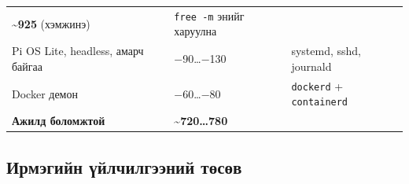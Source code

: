 \begin{longtable}[]{@{}lll@{}}
\begin{minipage}[t]{0.30\columnwidth}
\textbf{\textasciitilde925} (хэмжинэ)\strut
\end{minipage} & \begin{minipage}[t]{0.30\columnwidth}\raggedright
\texttt{free\ -m} энийг харуулна\strut
\end{minipage}\tabularnewline
\begin{minipage}[t]{0.30\columnwidth}\raggedright
Pi OS Lite, headless, амарч байгаа\strut
\end{minipage} & \begin{minipage}[t]{0.30\columnwidth}\raggedright
−90\ldots−130\strut
\end{minipage} & \begin{minipage}[t]{0.30\columnwidth}\raggedright
systemd, sshd, journald\strut
\end{minipage}\tabularnewline
\begin{minipage}[t]{0.30\columnwidth}\raggedright
Docker демон\strut
\end{minipage} & \begin{minipage}[t]{0.30\columnwidth}\raggedright
−60\ldots−80\strut
\end{minipage} & \begin{minipage}[t]{0.30\columnwidth}\raggedright
\texttt{dockerd} + \texttt{containerd}\strut
\end{minipage}\tabularnewline
\begin{minipage}[t]{0.30\columnwidth}\raggedright
\textbf{Ажилд боломжтой}\strut
\end{minipage} & \begin{minipage}[t]{0.30\columnwidth}\raggedright
\textbf{\textasciitilde720\ldots780}\strut
\end{minipage} & \begin{minipage}[t]{0.30\columnwidth}\raggedright
\strut
\end{minipage}\tabularnewline
\bottomrule
\end{longtable}\endgroup

\hypertarget{ux438ux440ux43cux44dux433ux438ux439ux43d-ux4afux439ux43bux447ux438ux43bux433ux44dux44dux43dux438ux439-ux442ux4e9ux441ux4e9ux432}{%
\subsection{Ирмэгийн үйлчилгээний төсөв}\label{ux438ux440ux43cux44dux433ux438ux439ux43d-ux4afux439ux43bux447ux438ux43bux433ux44dux44dux43dux438ux439-ux442ux4e9ux441ux4e9ux432}}

